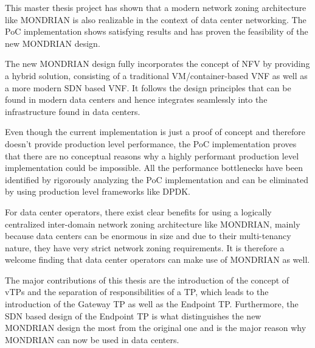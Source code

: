 
This master thesis project has shown that a modern network zoning architecture like MONDRIAN is also realizable in the context of data center networking. The \acs{PoC} \cite{meinen2021DCMONDRIAN} implementation shows satisfying results and has proven the feasibility of the new MONDRIAN design.

The new MONDRIAN design fully incorporates the concept of \acs{NFV} by providing a hybrid solution, consisting of a traditional \acs{VM}/container-based \acs{VNF} as well as a more modern \acs{SDN} based \acs{VNF}. It follows the design principles that can be found in modern data centers and hence integrates seamlessly into the infrastructure found in data centers.

Even though the current implementation is just a proof of concept and therefore doesn't provide production level performance, the \acs{PoC} implementation proves that there are no conceptual reasons why a highly performant production level implementation could be impossible. All the performance bottlenecks have been identified by rigorously analyzing the \acs{PoC} implementation and can be eliminated by using production level frameworks like \acs{DPDK}.

For data center operators, there exist clear benefits for using a logically centralized inter-domain network zoning architecture like MONDRIAN, mainly because data centers can be enormous in size and due to their multi-tenancy nature, they have very strict network zoning requirements. It is therefore a welcome finding that data center operators can make use of MONDRIAN as well.

The major contributions of this thesis are the introduction of the concept of \aclp{vTP} and the separation of responsibilities of a \acs{TP}, which leads to the introduction of the Gateway \acs{TP} as well as the Endpoint \acs{TP}. Furthermore, the \acs{SDN} based design of the Endpoint \acs{TP} is what distinguishes the new MONDRIAN design the most from the original one and is the major reason why MONDRIAN can now be used in data centers.

